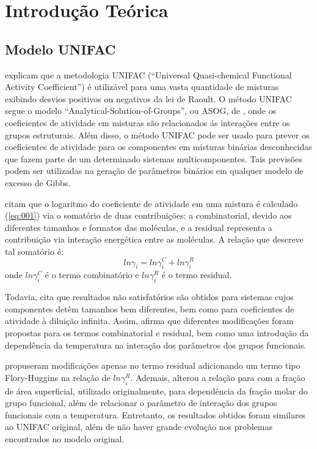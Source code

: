 \section{Introdução Teórica}

\subsection{Modelo UNIFAC}

 explicam que a metodologia UNIFAC 
(“Universal Quasi-chemical Functional Activity Coefficient”)
é utilizável para uma vasta quantidade de misturas exibindo 
desvios positivos ou negativos da lei de Raoult. O método 
UNIFAC segue o modelo “Analytical-Solution-of-Groups”, ou ASOG,
de , onde os coeficientes de atividade
em misturas são relacionados ás interações entre os 
grupos estruturais. Além disso, o método UNIFAC pode 
ser usado para prever os coeficientes de atividade para 
os componentes em misturas binárias desconhecidas que
fazem parte de um determinado sistemas multicomponentes. 
Tais previsões podem ser utilizadas na geração de parâmetros
 binários em qualquer modelo de excesso de Gibbs.


 citam que o logaritmo do coeficiente de
atividade em uma mistura é calculado (\autoref{eq:001}) via o somatório de duas
contribuições:
a combinatorial, devido aos diferentes tamanhos e formatos das moléculas, e a
residual representa a contribuição via interação energética entre as
moléculas. A relação que descreve tal somatório é:
\begin{equation}\label{eq:001}ln\gamma_i = ln\gamma_i^C +
ln\gamma_i^R\end{equation}
onde
$ln\gamma_i^C$ é o termo combinatório e $ln\gamma_i^R$ 
é o termo residual.


Todavia,  cita que resultados não  
satisfatórios são obtidos para
sistemas cujos componentes detêm tamanhos bem diferentes, bem
como para coeficientes de atividade à diluição infinita. 
Assim,  afirma que diferentes modificações 
foram propostas para os termos combinatorial e residual, 
bem como uma introdução da dependência da temperatura na 
interação dos parâmetros dos grupos funcionais.

 propuseram modificações apenas no termo residual
adicionando um termo tipo Flory-Huggins na relação de $ln\gamma_i^R$. 
Ademais, alterou a relação para com a fração de área 
superficial, utilizado originalmente, para dependência 
da fração molar do grupo funcional, além de relacionar o 
parâmetro de interação dos grupos funcionais com a 
temperatura. Entretanto, os resultados obtidos foram 
similares ao UNIFAC original, além de não haver grande 
evolução nos problemas encontrados no modelo original.

